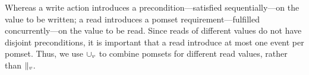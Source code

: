 
Whereas a write action introduces a precondition---satisfied
sequentially---on the value to be written; a read introduces a pomset
requirement---fulfilled concurrently---on the value to be read.  Since reads
of different values do not have disjoint preconditions, it is important that
a read introduce at most one event per pomset.  Thus, we use $\cup_v$ to
combine pomsets for different read values, rather than $\parallel_v$.



